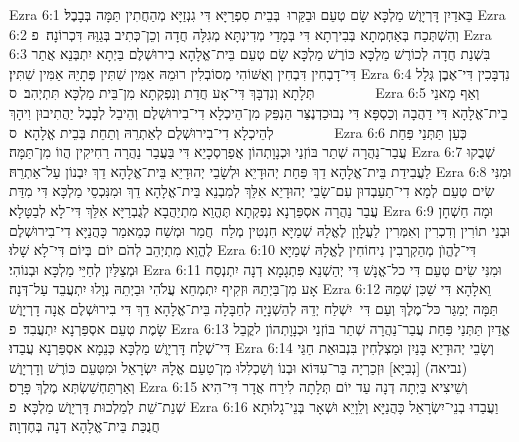 Ezra 6:1	בֵּאדַיִן דָּרְיָוֶשׁ מַלְכָּא שָׂם טְעֵם וּבַקַּרוּ  בְּבֵית סִפְרַיָּא דִּי גִנְזַיָּא מְהַחֲתִין תַּמָּה בְּבָבֶל׃
Ezra 6:2	וְהִשְׁתְּכַח בְּאַחְמְתָא בְּבִירְתָא דִּי בְּמָדַי מְדִינְתָּא מְגִלָּה חֲדָה וְכֵן־כְּתִיב בְּגַוַּהּ דִּכְרוֹנָה׃ {פ}
Ezra 6:3	בִּשְׁנַת חֲדָה לְכוֹרֶשׁ מַלְכָּא כּוֹרֶשׁ מַלְכָּא שָׂם טְעֵם בֵּית־אֱלָהָא בִירוּשְׁלֶם בַּיְתָא יִתְבְּנֵא אֲתַר דִּי־דָבְחִין דִּבְחִין וְאֻשּׁוֹהִי מְסוֹבְלִין רוּמֵהּ אַמִּין שִׁתִּין פְּתָיֵהּ אַמִּין שִׁתִּין׃
Ezra 6:4	נִדְבָּכִין דִּי־אֶבֶן גְּלָל תְּלָתָא וְנִדְבָּךְ דִּי־אָע חֲדַת וְנִפְקְתָא מִן־בֵּית מַלְכָּא תִּתְיְהִב׃ {ס}        
Ezra 6:5	וְאַף מָאנֵי בֵית־אֱלָהָא דִּי דַהֲבָה וְכַסְפָּא דִּי נְבוּכַדְנֶצַּר הַנְפֵּק מִן־הֵיכְלָא דִי־בִירוּשְׁלֶם וְהֵיבֵל לְבָבֶל יַהֲתִיבוּן וִיהָךְ לְהֵיכְלָא דִי־בִירוּשְׁלֶם לְאַתְרֵהּ וְתַחֵת בְּבֵית אֱלָהָא׃ {ס}        
Ezra 6:6	כְּעַן תַּתְּנַי פַּחַת עֲבַר־נַהֲרָה שְׁתַר בּוֹזְנַי וּכְנָוָתְהוֹן אֲפַרְסְכָיֵא דִּי בַּעֲבַר נַהֲרָה רַחִיקִין הֲווֹ מִן־תַּמָּה׃
Ezra 6:7	שְׁבֻקוּ לַעֲבִידַת בֵּית־אֱלָהָא דֵךְ פַּחַת יְהוּדָיֵא וּלְשָׂבֵי יְהוּדָיֵא בֵּית־אֱלָהָא דֵךְ יִבְנוֹן עַל־אַתְרֵהּ׃
Ezra 6:8	וּמִנִּי שִׂים טְעֵם לְמָא דִי־תַעַבְדוּן עִם־שָׂבֵי יְהוּדָיֵא אִלֵּךְ לְמִבְנֵא בֵּית־אֱלָהָא דֵךְ וּמִנִּכְסֵי מַלְכָּא דִּי מִדַּת עֲבַר נַהֲרָה אסְפַּרְנָא נִפְקְתָא תֶּהֱוֵא מִתְיַהֲבָא לְגֻבְרַיָּא אִלֵּךְ דִּי־לָא לְבַטָּלָא׃
Ezra 6:9	וּמָה חַשְׁחָן וּבְנֵי תוֹרִין וְדִכְרִין וְאִמְּרִין  לַעֲלָוָן  לֶאֱלָהּ שְׁמַיָּא חִנְטִין מְלַח  חֲמַר וּמְשַׁח כְּמֵאמַר כָּהֲנַיָּא דִי־בִירוּשְׁלֶם לֶהֱוֵא מִתְיְהֵב לְהֹם יוֹם  בְּיוֹם דִּי־לָא שָׁלוּ׃
Ezra 6:10	דִּי־לֶהֱוֺן מְהַקְרְבִין נִיחוֹחִין לֶאֱלָהּ שְׁמַיָּא וּמְצַלַּיִן לְחַיֵּי מַלְכָּא וּבְנוֹהִי׃
Ezra 6:11	וּמִנִּי שִׂים טְעֵם דִּי כל־אֱנָשׁ דִּי יְהַשְׁנֵא פִּתְגָמָא דְנָה יִתְנְסַח אָע מִן־בַּיְתֵהּ וּזְקִיף יִתְמְחֵא עֲלֹהִי וּבַיְתֵהּ נְוָלוּ יִתְעֲבֵד עַל־דְּנָה׃
Ezra 6:12	וֵאלָהָא דִּי שַׁכִּן שְׁמֵהּ תַּמָּה יְמַגַּר כּל־מֶלֶךְ וְעַם דִּי  יִשְׁלַח יְדֵהּ לְהַשְׁנָיָה לְחַבָּלָה בֵּית־אֱלָהָא דֵךְ דִּי בִירוּשְׁלֶם אֲנָה דָרְיָוֶשׁ שָׂמֶת טְעֵם אסְפַּרְנָא יִתְעֲבִד׃ {פ}
Ezra 6:13	אֱדַיִן תַּתְּנַי פַּחַת עֲבַר־נַהֲרָה שְׁתַר בּוֹזְנַי וּכְנָוָתְהוֹן לקֳבֵל דִּי־שְׁלַח דָּרְיָוֶשׁ מַלְכָּא כְּנֵמָא אסְפַּרְנָא עֲבַדוּ׃
Ezra 6:14	וְשָׂבֵי יְהוּדָיֵא בָּנַיִן וּמַצְלְחִין בִּנְבוּאַת חַגַּי (נביאה) [נְבִיָּא] וּזְכַרְיָה בַּר־עִדּוֹא וּבְנוֹ וְשַׁכְלִלוּ מִן־טַעַם אֱלָהּ יִשְׂרָאֵל וּמִטְּעֵם כּוֹרֶשׁ וְדָרְיָוֶשׁ וְאַרְתַּחְשַׁשְׂתְּא מֶלֶךְ פָּרָס׃
Ezra 6:15	וְשֵׁיצִיא בַּיְתָה דְנָה עַד יוֹם תְּלָתָה לִירַח אֲדָר דִּי־הִיא שְׁנַת־שֵׁת לְמַלְכוּת דָּרְיָוֶשׁ מַלְכָּא׃ {פ}
Ezra 6:16	וַעֲבַדוּ בְנֵי־יִשְׂרָאֵל כָּהֲנַיָּא וְלֵוָיֵא וּשְׁאָר בְּנֵי־גָלוּתָא חֲנֻכַּת בֵּית־אֱלָהָא דְנָה בְּחֶדְוָה׃
